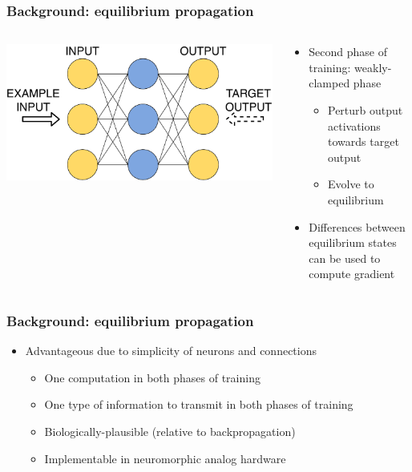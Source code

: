 \documentclass[pdf]{beamer}
\begin{document}
\begin{frame}
\frametitle{Background: equilibrium propagation}
\begin{columns}
	\begin{column}{.5\textwidth}
		\includegraphics[width=\textwidth]{figures/eqp_weakly_clamped.pdf}
	\end{column}
	\begin{column}{.5\textwidth}
		\begin{itemize}
			\item<1-> Second phase of training: weakly-clamped phase
			\begin{itemize}
				\item<2-> Perturb output activations towards target output
				\item<3-> Evolve to equilibrium
			\end{itemize}
			\item<4-> Differences between equilibrium states can be used to compute gradient
		\end{itemize}
	\end{column}
\end{columns}
\end{frame}

\begin{frame}
\frametitle{Background: equilibrium propagation}
\begin{itemize}
	\item<1-> Advantageous due to simplicity of neurons and connections
	\begin{itemize}
		\item<2-> One computation in both phases of training
		\item<3-> One type of information to transmit in both phases of training
		\item<4-> Biologically-plausible (relative to backpropagation)
		\item<5-> Implementable in neuromorphic analog hardware
	\end{itemize}
\end{itemize}
\end{frame}
\end{document}
